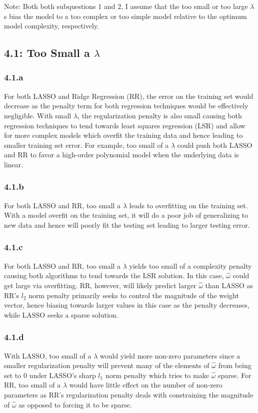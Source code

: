 \documentclass[12pt]{amsart}
\begin{document}
Note: Both both subquestions 1 and 2, I assume that the too small or too large $\lambda$s bias the model to a too complex or too simple model relative to the optimum model complexity, respectively.

\subsection*{4.1: Too Small a $\lambda$}
\subsubsection*{4.1.a}
For both LASSO and Ridge Regression (RR), the error on the training set would decrease as the penalty term for both regression techniques would be effectively negligible.  With small $\lambda$, the regularization penalty is also small causing both regression techniques to tend towards least squares regression (LSR) and allow for more complex models which overfit the training data and hence leading to smaller training set error.  For example, too small of a $\lambda$ could push both LASSO and RR to favor a high-order polynomial model when the underlying data is linear.

\subsubsection*{4.1.b}
For both LASSO and RR, too small a $\lambda$ leads to overfitting on the training set.  With a model overfit on the training set, it will do a poor job of generalizing to new data and hence will poorly fit the testing set leading to larger testing error.

\subsubsection*{4.1.c}
For both LASSO and RR, too small a $\lambda$ yields too small of a complexity penalty causing both algorithms to tend towards the LSR solution.  In this case, $\hat{\omega}$ could get large via overfitting.  RR, however, will likely predict larger $\hat{\omega}$ than LASSO as RR's $l_2$ norm penalty primarily seeks to control the magnitude of the weight vector, hence biasing towards larger values in this case as the penalty decreases, while LASSO seeks a sparse solution.


\subsubsection*{4.1.d}
With LASSO, too small of a $\lambda$ would yield more non-zero parameters since a smaller regularization penalty will prevent many of the elements of $\hat{\omega}$ from being set to 0 under LASSO's sharp $l_1$ norm penalty which tries to make $\hat{\omega}$ sparse.  For RR, too small of a $\lambda$ would have little effect on the number of non-zero parameters as RR's regularization penalty deals with constraining the magnitude of $\hat{\omega}$ as opposed to forcing it to be sparse.
\end{document}
